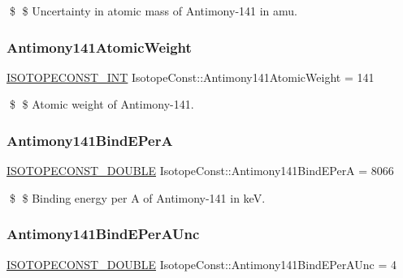 \$ \$ Uncertainty in atomic mass of Antimony-\/141 in amu. \mbox{\label{group___isotope_const-_antimony-_sb141_gaf54f06ed33046d545e7c7581e4676686}} 
\subsubsection{\texorpdfstring{Antimony141\+Atomic\+Weight}{Antimony141AtomicWeight}}
{\footnotesize\ttfamily \mbox{\hyperlink{group___isotope_const-_macros_ga5f18360b3e99483a35c32d789e62621c}{I\+S\+O\+T\+O\+P\+E\+C\+O\+N\+S\+T\+\_\+\+I\+NT}} Isotope\+Const\+::\+Antimony141\+Atomic\+Weight = 141}

\$ \$ Atomic weight of Antimony-\/141. \mbox{\label{group___isotope_const-_antimony-_sb141_ga2de25f4c39e097ca63f3853b6a9889b0}} 
\subsubsection{\texorpdfstring{Antimony141\+Bind\+E\+PerA}{Antimony141BindEPerA}}
{\footnotesize\ttfamily \mbox{\hyperlink{group___isotope_const-_macros_ga8f45a7272ce02c0b4c65c44636ed719a}{I\+S\+O\+T\+O\+P\+E\+C\+O\+N\+S\+T\+\_\+\+D\+O\+U\+B\+LE}} Isotope\+Const\+::\+Antimony141\+Bind\+E\+PerA = 8066}

\$ \$ Binding energy per A of Antimony-\/141 in keV. \mbox{\label{group___isotope_const-_antimony-_sb141_ga1f254a06fb9a34e2de7b978a3fd2915e}} 
\subsubsection{\texorpdfstring{Antimony141\+Bind\+E\+Per\+A\+Unc}{Antimony141BindEPerAUnc}}
{\footnotesize\ttfamily \mbox{\hyperlink{group___isotope_const-_macros_ga8f45a7272ce02c0b4c65c44636ed719a}{I\+S\+O\+T\+O\+P\+E\+C\+O\+N\+S\+T\+\_\+\+D\+O\+U\+B\+LE}} Isotope\+Const\+::\+Antimony141\+Bind\+E\+Per\+A\+Unc = 4}

